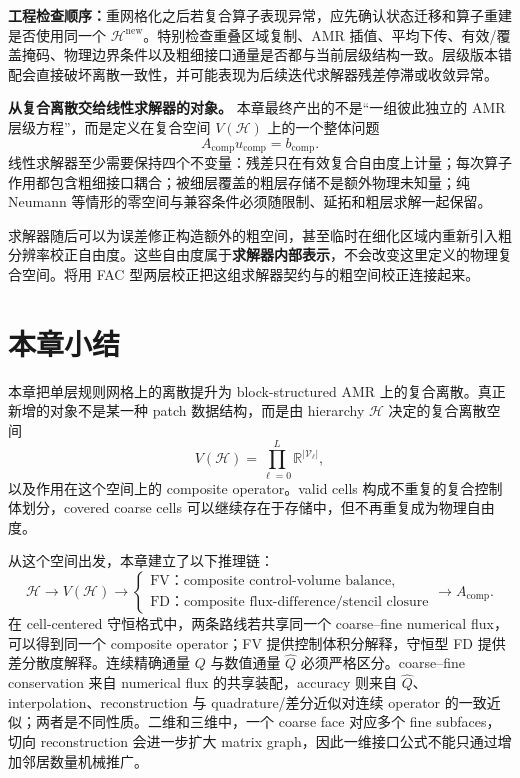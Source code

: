 \begin{engineeringbox}
\textbf{工程检查顺序：}重网格化之后若复合算子表现异常，应先确认状态迁移和算子重建是否使用同一个 $\mathcal H^{\mathrm{new}}$。特别检查重叠区域复制、AMR 插值、平均下传、有效/覆盖掩码、物理边界条件以及粗细接口通量是否都与当前层级结构一致。层级版本错配会直接破坏离散一致性，并可能表现为后续迭代求解器残差停滞或收敛异常。
\end{engineeringbox}


\begin{keybox}
\textbf{从复合离散交给线性求解器的对象。}
本章最终产出的不是“一组彼此独立的 AMR 层级方程”，而是定义在复合空间 $V(\mathcal H)$ 上的一个整体问题
\[
A_{\mathrm{comp}}u_{\mathrm{comp}}=b_{\mathrm{comp}}.
\]
线性求解器至少需要保持四个不变量：残差只在有效复合自由度上计量；每次算子作用都包含粗细接口耦合；被细层覆盖的粗层存储不是额外物理未知量；纯 Neumann 等情形的零空间与兼容条件必须随限制、延拓和粗层求解一起保留。

求解器随后可以为误差修正构造额外的粗空间，甚至临时在细化区域内重新引入粗分辨率校正自由度。这些自由度属于\textbf{求解器内部表示}，不会改变这里定义的物理复合空间。将用 FAC 型两层校正把这组求解器契约与的粗空间校正连接起来。
\end{keybox}

\section{本章小结}

本章把单层规则网格上的离散提升为 block-structured AMR 上的复合离散。真正新增的对象不是某一种 patch 数据结构，而是由 hierarchy $\mathcal H$ 决定的复合离散空间
\begin{equation}
V(\mathcal H)
=
\prod_{\ell=0}^{L}\mathbb R^{|\mathcal V_\ell|},
\end{equation}
以及作用在这个空间上的 composite operator。valid cells 构成不重复的复合控制体划分，covered coarse cells 可以继续存在于存储中，但不再重复成为物理自由度。

从这个空间出发，本章建立了以下推理链：
\begin{equation}
\boxed{
\mathcal H
\rightarrow
V(\mathcal H)
\rightarrow
\begin{cases}
\text{FV：composite control-volume balance},\\
\text{FD：composite flux-difference/stencil closure}
\end{cases}
\rightarrow
A_{\mathrm{comp}}.
}
\end{equation}
在 cell-centered 守恒格式中，两条路线若共享同一个 coarse--fine numerical flux，可以得到同一个 composite operator；FV 提供控制体积分解释，守恒型 FD 提供差分散度解释。连续精确通量 $Q$ 与数值通量 $\widehat Q$ 必须严格区分。coarse--fine conservation 来自 numerical flux 的共享装配，accuracy 则来自 $\widehat Q$、interpolation、reconstruction 与 quadrature/差分近似对连续 operator 的一致近似；两者是不同性质。二维和三维中，一个 coarse face 对应多个 fine subfaces，切向 reconstruction 会进一步扩大 matrix graph，因此一维接口公式不能只通过增加邻居数量机械推广。

